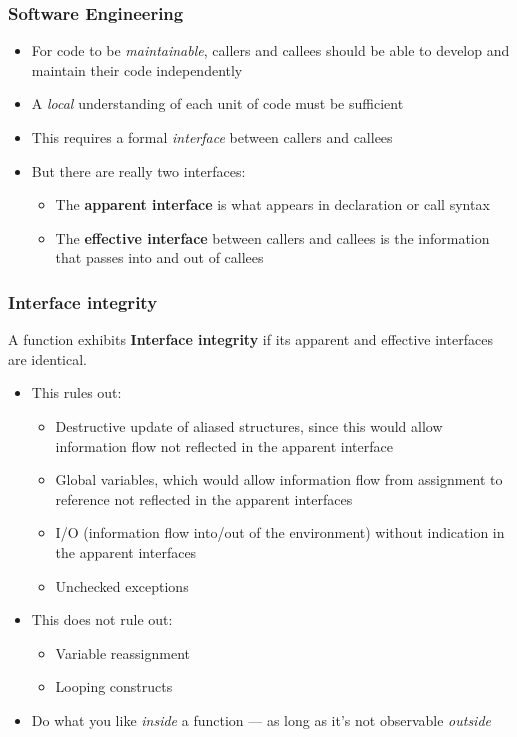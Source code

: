 \documentclass[12pt]{beamer}
\begin{document}
\begin{frame}
\frametitle{Software Engineering}
\begin{itemize}
\item For code to be \emph{maintainable}, callers and callees should be
  able to develop and maintain their code independently
\item A \emph{local} understanding of each unit of code must be sufficient
\item This requires a formal \emph{interface} between callers and callees
\item But there are really two interfaces:
  \begin{itemize}
  \item The \textbf{apparent interface} is what appears in declaration
    or call syntax
  \item The \textbf{effective interface} between callers and
    callees is the information that passes into and out of callees
  \end{itemize}
\end{itemize}

\end{frame}


\begin{frame}
\frametitle{Interface integrity}

A function exhibits \textbf{Interface integrity} if its apparent and
effective interfaces are identical.

\begin{itemize}
\item This rules out:
  \begin{itemize}
  \item Destructive update of aliased structures, since this would allow
    information flow not reflected in the apparent interface
  \item Global variables, which would allow information flow from
    assignment to reference not reflected in the apparent interfaces
  \item I/O (information flow into/out of the environment) without
    indication in the apparent interfaces
  \item Unchecked exceptions
  \end{itemize}
\item This does not rule out:
  \begin{itemize}
  \item Variable reassignment
  \item Looping constructs
  \end{itemize}
\item Do what you like \emph{inside} a function --- as long as it's not
  observable \emph{outside}
\end{itemize}

\end{frame}
\end{document}
